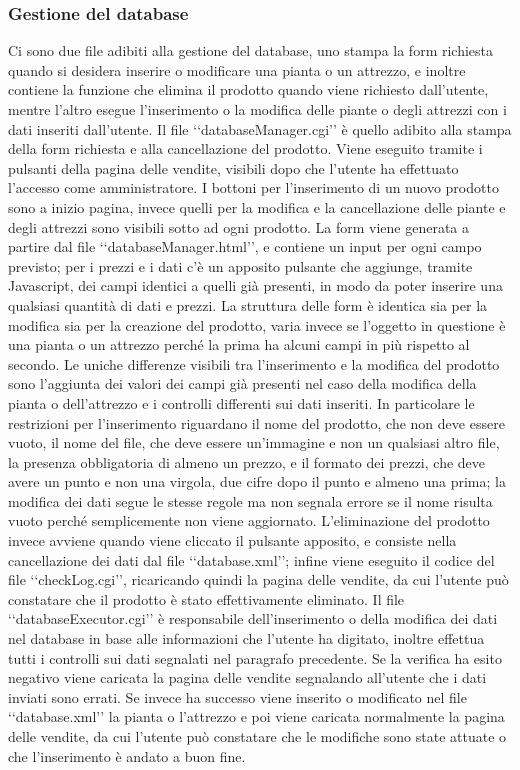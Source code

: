 {{		\subsubsection{Gestione del database}
			Ci sono due file adibiti alla gestione del database, uno stampa la form richiesta quando si desidera inserire o modificare una pianta o un attrezzo, e inoltre contiene la funzione che elimina il prodotto quando viene richiesto dall'utente, mentre l'altro esegue l'inserimento o la modifica delle piante o degli attrezzi con i dati inseriti dall'utente.
			Il file ‘‘databaseManager.cgi’’ è quello adibito alla stampa della form richiesta e alla cancellazione del prodotto. Viene eseguito tramite i pulsanti della pagina delle vendite, visibili dopo che l'utente ha effettuato l'accesso come amministratore. I bottoni per l'inserimento di un nuovo prodotto sono a inizio pagina, invece quelli per la modifica e la cancellazione delle piante e degli attrezzi sono visibili sotto ad ogni prodotto. La form viene generata a partire dal file ‘‘databaseManager.html’’, e contiene un input per ogni campo previsto; per i prezzi e i dati c'è un apposito pulsante che aggiunge, tramite Javascript, dei campi identici a quelli già presenti, in modo da poter inserire una qualsiasi quantità di dati e prezzi. La struttura delle form è identica sia per la modifica sia per la creazione del prodotto, varia invece se l'oggetto in questione è una pianta o un attrezzo perché la prima ha alcuni campi in più rispetto al secondo. Le uniche differenze visibili tra l'inserimento e la modifica del prodotto sono l'aggiunta dei valori dei campi già presenti nel caso della modifica della pianta o dell'attrezzo e i controlli differenti sui dati inseriti. In particolare le restrizioni per l'inserimento riguardano il nome del prodotto, che non deve essere vuoto, il nome del file, che deve essere un'immagine e non un qualsiasi altro file, la presenza obbligatoria di almeno un prezzo, e il formato dei prezzi, che deve avere un punto e non una virgola, due cifre dopo il punto e almeno una prima; la modifica dei dati segue le stesse regole ma non segnala errore se il nome risulta vuoto perché semplicemente non viene aggiornato. L'eliminazione del prodotto invece avviene quando viene cliccato il pulsante apposito, e consiste nella cancellazione dei dati dal file ‘‘database.xml’’; infine viene eseguito il codice del file ‘‘checkLog.cgi’’, ricaricando quindi la pagina delle vendite, da cui l'utente può constatare che il prodotto è stato effettivamente eliminato.
			Il file ‘‘databaseExecutor.cgi’’ è responsabile dell'inserimento o della modifica dei dati nel database in base alle informazioni che l'utente ha digitato, inoltre effettua tutti i controlli sui dati segnalati nel paragrafo precedente. Se la verifica ha esito negativo viene caricata la pagina delle vendite segnalando all'utente che i dati inviati sono errati. Se invece ha successo viene inserito o modificato nel file ‘‘database.xml’’ la pianta o l'attrezzo e poi viene caricata normalmente la pagina delle vendite, da cui l'utente può constatare che le modifiche sono state attuate o che l'inserimento è andato a buon fine.
	}
}